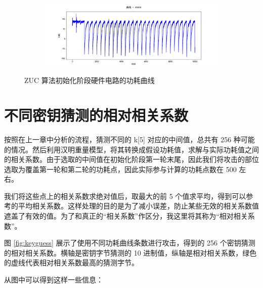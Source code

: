 \begin{figure}[htbp]
\begin{subfigure}{1.0\textwidth}
    \end{subfigure}
    \begin{subfigure}{1.0\textwidth}
        \includegraphics[height=.17\textheight, width=1.0\textwidth]{../images/trace_20000.png}
    \end{subfigure}

    \caption{ZUC 算法初始化阶段硬件电路的功耗曲线}

    \label{fig:traces}

\end{figure}

\newpage

\section{不同密钥猜测的相对相关系数}

按照在上一章中分析的流程，猜测不同的 {\cnsls k[5]} 对应的中间值，总共有 256 种可能的情况。然后利用汉明重量模型，将其转换成假设功耗值，求解与实际功耗值之间的相关系数。由于选取的中间值在初始化阶段第一轮末尾，因此我们将攻击的部位选取为覆盖第一轮和第二轮的功耗点，因此实际参与计算的功耗点数在 500 左右。

我们将这些点上的相关系数求绝对值后，取最大的前 5 个值求平均，得到可以参考的平均相关系数。这样处理的目的是为了减小误差，防止某些无效的相关系数值遮盖了有效的值。为了和真正的“相关系数”作区分，我这里将其称为“相对相关系数”。

\vspace*{\baselineskip}

图 \ref{fig:keyguess} 展示了使用不同功耗曲线条数进行攻击，得到的 256 个密钥猜测的相对相关系数。横轴是密钥字节猜测的 10 进制值，纵轴是相对相关系数，绿色的虚线代表相对相关系数最高的猜测字节。

从图中可以得到这样一些信息：

